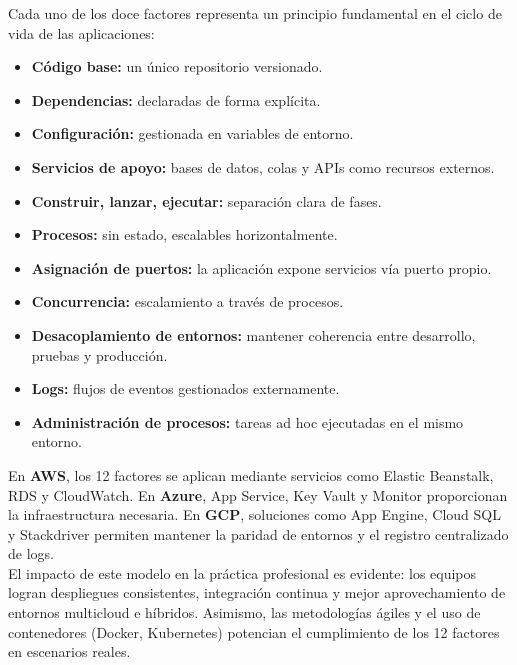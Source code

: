 \documentclass[12pt,letterpaper]{article}
\begin{document}
Cada uno de los doce factores representa un principio fundamental en el ciclo de vida de las aplicaciones:  \\
\begin{itemize}
\item \textbf{Código base:} un único repositorio versionado.  
\item \textbf{Dependencias:} declaradas de forma explícita.  
\item \textbf{Configuración:} gestionada en variables de entorno.  
\item \textbf{Servicios de apoyo:} bases de datos, colas y APIs como recursos externos.  
\item \textbf{Construir, lanzar, ejecutar:} separación clara de fases.  
\item \textbf{Procesos:} sin estado, escalables horizontalmente.  
\item \textbf{Asignación de puertos:} la aplicación expone servicios vía puerto propio.  
\item \textbf{Concurrencia:} escalamiento a través de procesos.  
\item \textbf{Desacoplamiento de entornos:} mantener coherencia entre desarrollo, pruebas y producción.  
\item \textbf{Logs:} flujos de eventos gestionados externamente.  
\item \textbf{Administración de procesos:} tareas ad hoc ejecutadas en el mismo entorno.  
\end{itemize}

En \textbf{AWS}, los 12 factores se aplican mediante servicios como Elastic Beanstalk, RDS y CloudWatch. En \textbf{Azure}, App Service, Key Vault y Monitor proporcionan la infraestructura necesaria. En \textbf{GCP}, soluciones como App Engine, Cloud SQL y Stackdriver permiten mantener la paridad de entornos y el registro centralizado de logs.  \\

El impacto de este modelo en la práctica profesional es evidente: los equipos logran despliegues consistentes, integración continua y mejor aprovechamiento de entornos multicloud e híbridos. Asimismo, las metodologías ágiles y el uso de contenedores (Docker, Kubernetes) potencian el cumplimiento de los 12 factores en escenarios reales.\\
\end{document}
